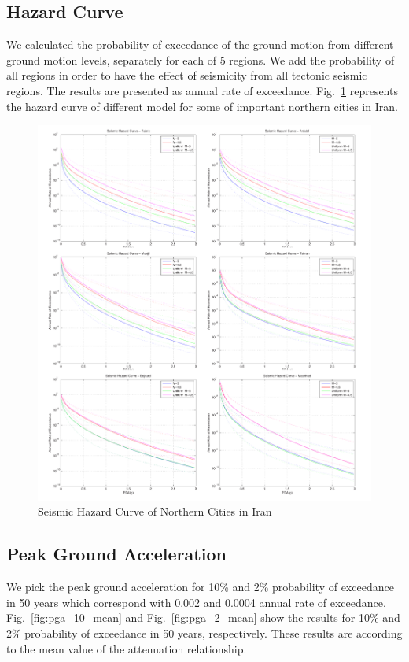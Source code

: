 \subsection{Hazard Curve}
We calculated the probability of exceedance of the ground motion from different ground motion levels, separately for each of 5 regions. We add the probability of all regions in order to have the effect of seismicity from all tectonic seismic regions. The results are presented as annual rate of exceedance. Fig.~\ref{fig:hazardcurve} represents the hazard curve of different model for some of important northern cities in Iran. 

\begin{figure} [!ht]
\centering
\includegraphics[scale=0.4]{figures/pdf/HazardCurve.pdf} 
\caption{Seismic Hazard Curve of Northern Cities in Iran}
\label{fig:hazardcurve}
\end{figure}



\subsection{Peak Ground Acceleration}
We pick the peak ground acceleration for 10\% and 2\% probability of exceedance in 50 years which correspond with 0.002 and 0.0004 annual rate of exceedance. 
Fig.~\ref{fig:pga_10_mean} and Fig.~\ref{fig:pga_2_mean} show the results for 10\% and 2\% probability of exceedance in 50 years, respectively. These results are according to the mean value of the attenuation relationship.

